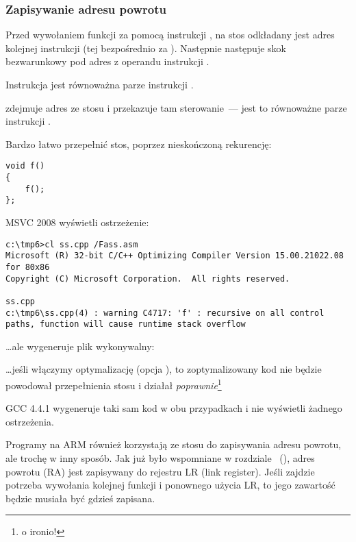 \subsubsection{Zapisywanie adresu powrotu}


Przed wywołaniem funkcji za pomocą instrukcji \CALL, na stos odkładany jest adres kolejnej instrukcji (tej bezpośrednio za \CALL). Następnie następuje skok bezwarunkowy pod adres z operandu instrukcji \CALL.

Instrukcja \CALL jest równoważna parze instrukcji .

\RET zdejmuje adres ze stosu i przekazuje tam sterowanie~---
jest to równoważne parze instrukcji .

\myindex{\Stack!\MLStackOverflow}
\myindex{\Recursion}
Bardzo łatwo przepełnić stos, poprzez nieskończoną rekurencję:

\begin{lstlisting}[style=customc]
void f()
{
	f();
};
\end{lstlisting}

MSVC 2008 wyświetli ostrzeżenie:

\begin{lstlisting}
c:\tmp6>cl ss.cpp /Fass.asm
Microsoft (R) 32-bit C/C++ Optimizing Compiler Version 15.00.21022.08 for 80x86
Copyright (C) Microsoft Corporation.  All rights reserved.

ss.cpp
c:\tmp6\ss.cpp(4) : warning C4717: 'f' : recursive on all control paths, function will cause runtime stack overflow
\end{lstlisting}

\dots ale wygeneruje plik wykonywalny:



\dots jeśli włączymy optymalizację (opcja \TT{\Ox}), to zoptymalizowany kod nie będzie powodował przepełnienia stosu i działał  \emph{poprawnie}\footnote{o ironio!}



GCC 4.4.1 wygeneruje taki sam kod w obu przypadkach i nie wyświetli żadnego ostrzeżenia.


Programy na ARM również korzystają ze stosu do zapisywania adresu powrotu, ale trochę w inny sposób.
Jak już było wspomniane w rozdziale \q{\HelloWorldSectionName}~(),
adres powrotu (\ac{RA}) jest zapisywany do rejestru \ac{LR} (\gls{link register}).
Jeśli zajdzie potrzeba wywołania kolejnej funkcji i ponownego użycia  \ac{LR}, to jego zawartość będzie musiała być gdzieś zapisana.

